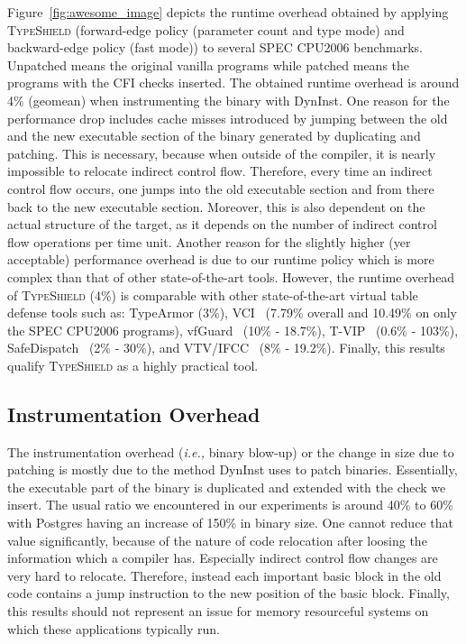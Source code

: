 Figure~\ref{fig:awesome_image} depicts the runtime overhead obtained by applying \textsc{TypeShield} (forward-edge policy (parameter count and type mode) and backward-edge policy (fast mode))
to several SPEC CPU2006 benchmarks. Unpatched means the original vanilla programs while patched means the programs with the CFI checks inserted.
The obtained runtime overhead is around 4\% (geomean) when instrumenting the binary with DynInst. 
One reason for the performance drop includes cache misses introduced by jumping between the old and the new executable section 
of the binary generated by duplicating and patching. This is necessary, because when
outside of the compiler, it is nearly impossible to relocate indirect control flow. Therefore, 
every time an indirect control flow occurs, one jumps into the old executable section and from 
there back to the new executable section. Moreover, this is also dependent on the actual structure 
of the target, as it depends on the number of indirect control flow operations per time unit.
Another reason for the slightly higher (yer acceptable) performance overhead is due to our
runtime policy which is more complex than that of other state-of-the-art tools.
However, the runtime overhead of \textsc{TypeShield} (4\%) is comparable with other state-of-the-art virtual table defense
tools such as: TypeArmor (3\%), VCI~\cite{vci:asiaccs} (7.79\% overall and 10.49\% on only the SPEC CPU2006 programs), vfGuard~\cite{vfuard:aravind} (10\% - 18.7\%), T-VIP~\cite{gawlik} (0.6\% - 103\%), 
SafeDispatch~\cite{safedispatch:jang} (2\% - 30\%), and VTV/IFCC~\cite{vtv:tice} (8\% - 19.2\%).
Finally, this results qualify \textsc{TypeShield} as a highly practical tool.


\subsection{Instrumentation Overhead}
\label{section:typeshieldoverheadinstrumentation}


The instrumentation overhead (\textit{i.e.,} binary blow-up) or the change in size due to patching is mostly due to the method DynInst uses to patch binaries. 
Essentially, the executable part of the binary is duplicated and extended with the check we insert. The usual ratio we encountered in our experiments is 
around 40\% to 60\% with Postgres having an increase of 150\% in binary size. One cannot reduce that 
value significantly, because of the nature of code relocation after loosing the information which a compiler has. Especially indirect control flow 
changes are very hard to relocate. Therefore, instead each important basic block in the old code contains a jump instruction to the new position of the basic block.
Finally, this results should not represent an issue for memory resourceful systems on which these applications typically run.

